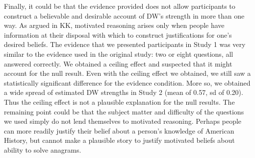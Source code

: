 \documentclass{article}
\begin{document}
Finally, it could be that the evidence provided does not allow participants to construct a believable and desirable account of DW's strength in more than one way. As argued in KK, motivated reasoning arises only when people have information at their disposal with which to construct justifications for one's desired beliefs. The evidence that we presented participants in Study 1 was very similar to the evidence used in the original study: two or eight questions, all answered correctly. We obtained a ceiling effect and suspected that it might account for the null result. Even with the ceiling effect we obtained, we still saw a statistically significant difference for the evidence condition. More so, we obtained a wide spread of estimated DW strengths in Study 2 (mean of 0.57, sd of 0.20). Thus the ceiling effect is not a plausible explanation for the null results. The remaining point could be that the subject matter and difficulty of the questions we used simply do not lend themselves to motivated reasoning. Perhaps people can more readily justify their belief about a person's knowledge of American History, but cannot make a plausible story to justify motivated beliefs about ability to solve anagrams. 



\setlength{\bibleftmargin}{.125in}
\setlength{\bibindent}{-\bibleftmargin}


\end{document}
